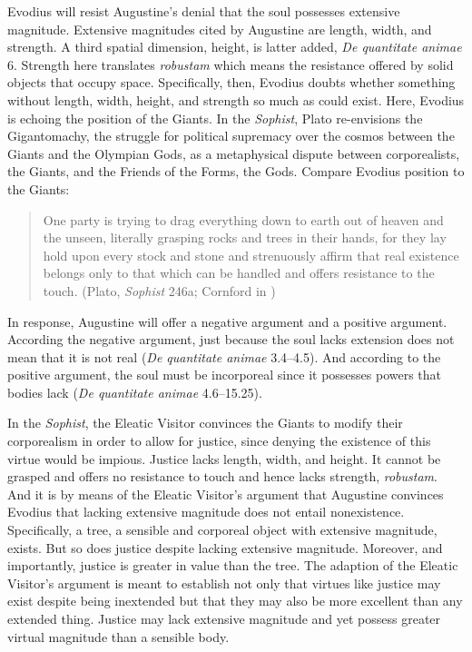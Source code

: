 \documentclass[12pt]{article}
\begin{document}
Evodius will resist Augustine’s denial that the soul possesses extensive magnitude. Extensive magnitudes cited by Augustine are length, width, and strength. A third spatial dimension, height, is latter added, \emph{De quantitate animae} 6. Strength here translates \emph{robustam} which means the resistance offered by solid objects that occupy space. Specifically, then, Evodius doubts whether something without length, width, height, and strength so much as could exist. 
Here, Evodius is echoing the position of the Giants. In the \emph{Sophist}, Plato re-envisions the Gigantomachy, the struggle for political supremacy over the cosmos between the Giants and the Olympian Gods, as a metaphysical dispute between corporealists, the Giants, and the Friends of the Forms, the Gods. Compare Evodius position to the Giants:
\begin{quote}
	One party is trying to drag everything down to earth out of heaven and the unseen, literally grasping rocks and trees in their hands, for they lay hold upon every stock and stone and strenuously affirm that real existence belongs only to that which can be handled and offers resistance to the touch. (Plato, \emph{Sophist} 246a; Cornford in \citealt[990]{Hamilton:1989fk})
\end{quote}
In response, Augustine will offer a negative argument and a positive argument. According the negative argument, just because the soul lacks extension does not mean that it is not real (\emph{De quantitate animae} 3.4–4.5). And according to the positive argument, the soul must be incorporeal since it possesses powers that bodies lack (\emph{De quantitate animae} 4.6–15.25).

In the \emph{Sophist}, the Eleatic Visitor convinces the Giants to modify their corporealism in order to allow for justice, since denying the existence of this virtue would be impious. Justice lacks length, width, and height. It cannot be grasped and offers no resistance to touch and hence lacks strength, \emph{robustam}. And it is by means of the Eleatic Visitor’s argument that Augustine convinces Evodius that lacking extensive magnitude does not entail nonexistence. Specifically, a tree, a sensible and corporeal object with extensive magnitude, exists. But so does justice despite lacking extensive magnitude. Moreover, and importantly, justice is greater in value than the tree. The adaption of the Eleatic Visitor’s argument is meant to establish not only that virtues like justice may exist despite being inextended but that they may also be more excellent than any extended thing. Justice may lack extensive magnitude and yet possess greater virtual magnitude than a sensible body. 
\end{document}
